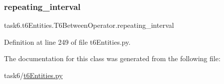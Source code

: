 \subsubsection{\texorpdfstring{repeating\+\_\+interval}{repeating\_interval}}
{\footnotesize\ttfamily task6.\+t6\+Entities.\+T6\+Between\+Operator.\+repeating\+\_\+interval}



Definition at line 249 of file t6\+Entities.\+py.



The documentation for this class was generated from the following file\+:\begin{DoxyCompactItemize}
\item 
task6/\hyperlink{t6Entities_8py}{t6\+Entities.\+py}\end{DoxyCompactItemize}
